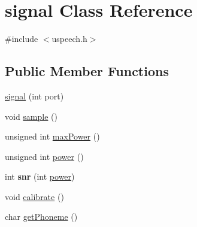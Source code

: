 \hypertarget{classsignal}{\section{signal Class Reference}
\label{classsignal}
}


{\ttfamily \#include $<$uspeech.\-h$>$}

\subsection*{Public Member Functions}
\begin{DoxyCompactItemize}
\item 
\hyperlink{classsignal_a16fc90703b77adff91d00f7a80f44059}{signal} (int port)
\item 
void \hyperlink{classsignal_aaba77b67c912d6aa7c36bd335d8381f4}{sample} ()
\item 
unsigned int \hyperlink{classsignal_a0acbadb8a805a5b0feca58904e843313}{max\-Power} ()
\item 
unsigned int \hyperlink{classsignal_aa0c0c4f353dd02096eed32044ac463d7}{power} ()
\item 
\hypertarget{classsignal_a23ecaa2397b4ac93ee7c0cd51d36668c}{int {\bfseries snr} (int \hyperlink{classsignal_aa0c0c4f353dd02096eed32044ac463d7}{power})}\label{classsignal_a23ecaa2397b4ac93ee7c0cd51d36668c}

\item 
void \hyperlink{classsignal_a6a19e421bd022a93575032165868a78c}{calibrate} ()
\item 
char \hyperlink{classsignal_a85bf609441248bb75d15d7c2999a77b8}{get\-Phoneme} ()
\end{DoxyCompactItemize}
